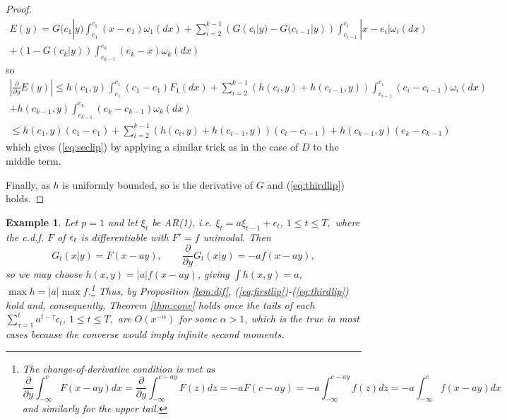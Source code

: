 \documentclass{article}              %
\newtheorem{example}{Example}
\begin{document}
\begin{proof}
\begin{multline*}
E(y)=G(c_{1}|y)\int_{e_{1}}^{c_{1}}(x-e_{1})\omega_{1}(dx)
+\sum_{i=2}^{k-1}(G(c_{i}|y)-G(c_{i-1}|y))\int_{c_{i-1}}^{c_{i}}|x-e_{i}|\omega_{i}(dx)\\
+(1-G(c_{k}|y))\int_{c_{k-1}}^{e_{k}}(e_{k}-x)\omega_{k}(dx)
\end{multline*}
so 
\begin{multline*}
\left|\frac{\partial}{\partial y}E(y)\right|
\leq h(c_{1},y)\int_{e_{1}}^{c_{1}}(c_{1}-e_{1})F_{1}(dx)+\sum_{i=2}^{k-1}(h(c_{i},y)+h(c_{i-1},y))\int_{c_{i-1}}^{c_{i}}(c_{i}-c_{i-1})\omega_{i}(dx)\\
+h(c_{k-1},y)\int_{c_{k-1}}^{e_{k}}(e_{k}-c_{k-1})\omega_{k}(dx)\\
\leq h(c_{1},y)(c_{1}-e_{1})+\sum_{i=2}^{k-1}(h(c_{i},y)+h(c_{i-1},y))(c{}_{i}-c_{i-1})+h(c_{k-1},y)(e_{k}-c_{k-1})
\end{multline*}
which gives (\ref{eq:seclip}) by applying a similar trick as in the
case of $D$ to the middle term. 

Finally, as $h$ is uniformly bounded, so is the derivative of $G$
and (\ref{eq:thirdlip}) holds.
\end{proof}

\begin{example}
Let $p=1$ and let $\xi_{t}$ be AR(1), i.e. $\xi_{t}=a\xi_{t-1}+\epsilon_{t}$,
$1\leq t\leq T,$ where the c.d.f. $F$ of $\text{\ensuremath{\epsilon_{t}}}$
is differentiable with $F'=f$ unimodal. Then 
\[
G_{t}(x|y)=F(x-ay),\qquad\frac{\partial}{\partial y}G_{t}(x|y)=-af(x-ay),
\]
so we may choose $h(x,y)=|a|f(x-ay)$, giving $\int h(x,y)=a$, $\max h=|a|\max f$.\footnote{The change-of-derivative condition is met as 
$$
\frac{\partial}{\partial y}\int_{-\infty}^{c}F(x-ay)dx=\frac{\partial}{\partial y}\int_{-\infty}^{c-ay}F(z)dz
=-aF(c-ay)=-a\int_{-\infty}^{c-ay}f(z)dz=-a\int_{-\infty}^{c}f(x-ay)dx
$$
and similarly for the upper tail.} Thus, by Proposition \ref{lem:dif}, (\ref{eq:firstlip})-(\ref{eq:thirdlip})
hold and, consequently, Theorem \ref{thm:conv} holds once the tails
of each $\sum_{\tau=1}^{t}a^{t-\tau}\epsilon_{t}$, $1\leq t\leq T,$
are \emph{$O(x^{-\alpha})$ }for some \emph{$\alpha>1$}, which is
the true in most cases because the converse would imply infinite second
moments. 
\end{example}
\end{document}
